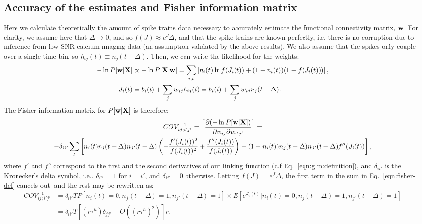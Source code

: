 \subsection{Accuracy of the estimates and Fisher information matrix} \label{sec:methods:accuracy_Fisher}

Here we calculate theoretically the amount of spike trains data necessary to accurately estimate the functional connectivity matrix, $\mathbf{w}$. For clarity, we assume here that $\Delta \rightarrow 0$, and so $f(J)\approx e^J\Delta$, and that the spike trains are known perfectly, i.e. there is no corruption due to inference from low-SNR calcium imaging data (an assumption validated by the above results). We also assume that the spikes only couple over a single time bin, so $h_{ij}(t)\equiv n_j(t-\Delta)$. Then, we can write the likelihood for the weights:
\begin{align}\label{eqn:fisher-glm}
-\ln P[\bw | \bX] &\propto -\ln P[\bX | \bw] =
\sum\limits_{i,t} \left[ n_i(t) \ln f(J_i(t)) + (1-n_i(t)) (1-f(J_i(t))) \right], \\
J_i(t) &= b_i(t) + \sum\limits_j w_{ij} h_{ij}(t) = b_i(t) + \sum\limits_j w_{ij} n_j(t-\Delta) 
.
\end{align}
The Fisher information matrix for $P[\mathbf{w} | {\bf X}]$ is therefore:
\begin{multline}\label{eqn:fisher-def}
COV^{-1}_{ij;i'j'}=\left[\frac{\partial (-\ln P[\bw | \bX])}{\partial \w_{ij}\partial \w_{i'j'}}\right]
=\\-\delta_{ii'}\sum\limits_t\left[
n_i(t)n_{j}(t-\Delta)n_{j'}(t-\Delta)\left(-\frac{f'(J_i(t))^2}{f(J_i(t))^2} +
\frac{f''(J_i(t))}{f(J_i(t))}\right) -(1-n_i(t))n_{j}(t-\Delta)n_{j'}(t-\Delta)f''(J_i(t))\right],
\end{multline}
where $f'$ and $f''$ correspond to the first and the second derivatives of our linking function (c.f Eq.~\eqref{eqn:glm:definition}), and $\delta_{ii'}$ is the Kronecker's delta symbol, i.e., $\delta_{ii'}=1$ for $i=i'$, and $\delta_{ii'}=0$ otherwise.  Letting $f(J)=e^J\Delta$, the first term in the sum in Eq.~\eqref{eqn:fisher-def} cancels out, and the rest may be rewritten as:
\begin{align}\label{eqn:fisher}
COV^{-1}_{ij;i'j'}
&=\delta_{ii'} T P[n_i(t)=0, n_j(t-\Delta)=1, n_{j'}(t-\Delta)=1]%
\times E[e^{J_i(t)}|n_i(t)=0, n_j(t-\Delta)=1, n_{j'}(t-\Delta)=1] \nonumber \\
&= \delta_{ii'}T\left[(r \tau^h)\delta_{jj'}+O((r \tau^h)^2)\right]r.
\end{align}
